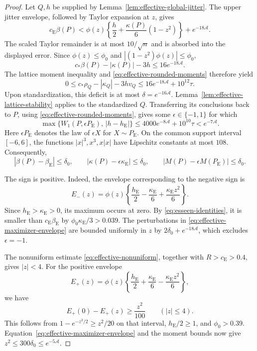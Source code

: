 \documentclass[aop]{imsart}
\theoremstyle{plain}
\theoremstyle{definition}
\theoremstyle{definition}
\newcommand{\ce}{c_{\mathrm E}}
\newcommand{\be}{\beta_{\mathrm E}}
\newcommand{\ke}{\kappa_{\mathrm E}}
\newcommand{\Pe}{P_{\mathrm E}}
\begin{document}
\begin{proof}
Let $Q,h$ be supplied by Lemma~\ref{lem:effective-global-jitter}.
The upper jitter envelope, followed by Taylor expansion at $z$, gives
\begin{equation}\label{eq:effective-maximizer-envelope}
 \ce\beta(P)<
 \phi(z)\left\{\frac h2+\frac{\kappa(P)}6(1-z^2)\right\}
 +e^{-18\mathcal A}.
\end{equation}
The scaled Taylor remainder is at most $10/\sqrt n$ and is
absorbed into the displayed error.  Since
$\phi(z)\le\phi_0$ and $|(1-z^2)\phi(z)|\le\phi_0$,
\[
 c_*\beta(P)-|\kappa(P)|-3h\le16e^{-18\mathcal A}.
\]
The lattice moment inequality and \eqref{eq:effective-rounded-moments}
therefore yield
\[
 0\le c_*\rho_Q-|\kappa_Q|-3hv_Q
 \le16e^{-18\mathcal A}+10^{12}\tau.
\]
Upon standardization, this deficit is at most
$\delta=e^{-16\mathcal A}$.  Lemma~\ref{lem:effective-lattice-stability}
applies to the standardized $Q$.  Transferring its conclusions back to
$P$, using \eqref{eq:effective-rounded-moments}, gives some
$\epsilon\in\{-1,1\}$ for which
\[
 \max\{W_1(P,\epsilon\Pe),\,|h-h_{\mathrm E}|\}
 \le4000e^{-8\mathcal A}+10^{10}\tau<e^{-7\mathcal A}.
\]
Here $\epsilon\Pe$ denotes the law of $\epsilon X$ for $X\sim\Pe$.
On the common support interval $[-6,6]$, the functions
$|x|^3,x^3,x|x|$ have Lipschitz constants at most $108$.
Consequently,
\[
 |\beta(P)-\be|\le\delta_0,\qquad
 |\kappa(P)-\epsilon\ke|\le\delta_0,\qquad
 |M(P)-\epsilon M(\Pe)|\le\delta_0.
\]

The sign is positive.  Indeed, the envelope corresponding to the
negative sign is
\[
 E_-(z)=\phi(z)\left\{\frac{h_{\mathrm E}}{2}-\frac{\ke}{6}
                            +\frac{\ke z^2}{6}\right\}.
\]
Since $h_{\mathrm E}>\ke>0$, its maximum occurs at zero.  By
\eqref{eq:esseen-identities}, it is smaller than $\ce\be$ by
$\phi_0\ke/3>0.039$.  The perturbations in
\eqref{eq:effective-maximizer-envelope} are bounded uniformly in $z$
by $2\delta_0+e^{-18\mathcal A}$, which excludes $\epsilon=-1$.

The nonuniform estimate \eqref{eq:effective-nonuniform}, together
with $R>\ce>0.4$, gives $|z|<4$.  For the positive envelope
\[
 E_+(z)=\phi(z)\left\{\frac{h_{\mathrm E}}{2}+\frac{\ke}{6}
                            -\frac{\ke z^2}{6}\right\},
\]
we have
\[
 E_+(0)-E_+(z)\ge\frac{z^2}{100}\qquad(|z|\le4).
\]
This follows from $1-e^{-z^2/2}\ge z^2/20$ on that interval,
$h_{\mathrm E}/2\ge1$, and $\phi_0>0.39$.
Equation~\eqref{eq:effective-maximizer-envelope} and the moment
bounds now give $z^2\le300\delta_0\le e^{-5\mathcal A}$.
\end{proof}
\end{document}
